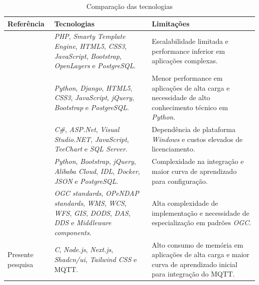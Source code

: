 \begin{table}[!htb]
    \caption{Comparação das tecnologias} \label{tab:comparacao}
    \begin{tabularx}{\textwidth}{|X|X|X|} \hline
        \textbf{Referência} & \textbf{Tecnologias} & \textbf{Limitações} \\ \hline
        \textcite{Taison_webeva2019} & \textit{PHP}, \textit{Smarty Template Engine}, \textit{HTML5}, \textit{CSS3}, \textit{JavaScript}, \textit{Bootstrap}, \textit{OpenLayers} e \textit{PostgreSQL}. & Escalabilidade limitada e performance inferior em aplicações complexas. \\ \hline
        \textcite{Serban_webeva2022} & \textit{Python}, \textit{Django}, \textit{HTML5}, \textit{CSS3}, \textit{JavaScript}, \textit{jQuery}, \textit{Bootstrap} e \textit{PostgreSQL}. & Menor performance em aplicações de alta carga e necessidade de alto conhecimento técnico em \textit{Python}. \\ \hline
        \textcite{Jose_webeva2011} & \textit{C\#}, \textit{ASP.Net}, \textit{Visual Studio.NET}, \textit{JavaScript}, \textit{TeeChart} e \textit{SQL Server}. & Dependência de plataforma \textit{Windows} e custos elevados de licenciamento. \\ \hline
        \textcite{Fangming_webeva2021} & \textit{Python}, \textit{Bootstrap}, \textit{jQuery}, \textit{Alibaba Cloud}, \textit{IDL}, \textit{Docker}, \textit{JSON} e \textit{PostgreSQL}. & Complexidade na integração e maior curva de aprendizado para configuração. \\ \hline
        \textcite{Jianting_webeva2009} & \textit{OGC standards}, \textit{OPeNDAP standards}, \textit{WMS}, \textit{WCS}, \textit{WFS}, \textit{GIS}, \textit{DODS}, \textit{DAS}, \textit{DDS} e \textit{Middleware components}. & Alta complexidade de implementação e necessidade de especialização em padrões \textit{OGC}. \\ \hline
        Presente pesquisa & \textit{C}, \textit{Node.js}, \textit{Next.js}, \textit{Shadcn/ui}, \textit{Tailwind CSS} e MQTT. & Alto consumo de memória em aplicações de alta carga e maior curva de aprendizado inicial para integração do MQTT. \\ \hline
    \end{tabularx}
\end{table}
